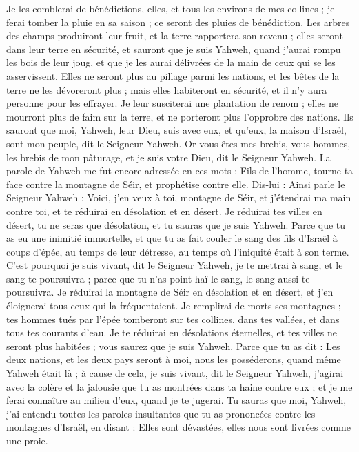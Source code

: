 \begin{multicols}{2}
Je les comblerai de bénédictions, elles, et tous les environs de mes collines ; je ferai tomber la pluie en sa saison ; ce seront des pluies de bénédiction.
Les arbres des champs produiront leur fruit, et la terre rapportera son revenu ; elles seront dans leur terre en sécurité, et sauront que je suis Yahweh, quand j'aurai rompu les bois de leur joug, et que je les aurai délivrées de la main de ceux qui se les asservissent.
Elles ne seront plus au pillage parmi les nations, et les bêtes de la terre ne les dévoreront plus ; mais elles habiteront en sécurité, et il n'y aura personne pour les effrayer.
Je leur susciterai une plantation de renom ; elles ne mourront plus de faim sur la terre, et ne porteront plus l'opprobre des nations.
Ils sauront que moi, Yahweh, leur Dieu, suis avec eux, et qu'eux, la maison d'Israël, sont mon peuple, dit le Seigneur Yahweh.
Or vous êtes mes brebis, vous hommes, les brebis de mon pâturage, et je suis votre Dieu, dit le Seigneur Yahweh.
\VerseOne{}La parole de Yahweh me fut encore adressée en ces mots :
Fils de l’homme, tourne ta face contre la montagne de Séir, et prophétise contre elle\FTNT{}.
Dis-lui : Ainsi parle le Seigneur Yahweh : Voici, j'en veux à toi, montagne de Séir, et j'étendrai ma main contre toi, et te réduirai en désolation et en désert.
Je réduirai tes villes en désert, tu ne seras que désolation, et tu sauras que je suis Yahweh.
Parce que tu as eu une inimitié immortelle, et que tu as fait couler le sang des fils d'Israël à coups d'épée, au temps de leur détresse, au temps où l’iniquité était à son terme\FTNT{}.
C'est pourquoi je suis vivant, dit le Seigneur Yahweh, je te mettrai à sang, et le sang te poursuivra ; parce que tu n'as point haï le sang, le sang aussi te poursuivra.
Je réduirai la montagne de Séir en désolation et en désert, et j'en éloignerai tous ceux qui la fréquentaient.
Je remplirai de morts ses montagnes ; tes hommes tués par l'épée tomberont sur tes collines, dans tes vallées, et dans tous tes courants d'eau.
Je te réduirai en désolations éternelles, et tes villes ne seront plus habitées ; vous saurez que je suis Yahweh.
Parce que tu as dit : Les deux nations, et les deux pays seront à moi,  nous les posséderons, quand même Yahweh était là ;
à cause de cela, je suis vivant, dit le Seigneur Yahweh, j'agirai avec la colère et la jalousie que tu as montrées dans ta haine contre eux ; et je me ferai connaître au milieu d’eux, quand je te jugerai.
Tu sauras que moi, Yahweh, j'ai entendu toutes les paroles insultantes que tu as prononcées contre les montagnes d'Israël, en disant : Elles sont dévastées, elles nous sont livrées comme une proie.

\end{multicols}
